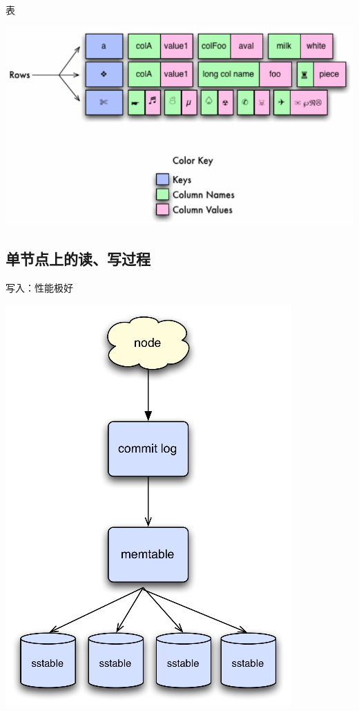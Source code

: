 \documentclass{beamer}
\begin{document}
\begin{CJK}{UTF8}{gbsn}
\begin{frame}{表}
  \begin{center}
    \includegraphics[scale=0.3]{./images/table}
  \end{center}
\end{frame}


\subsection{单节点上的读、写过程}

\begin{frame}{写入：性能极好}
  \begin{center}
    \includegraphics[scale=0.4]{./images/write-process}
  \end{center}
\end{frame}


\end{CJK}
\end{document}
